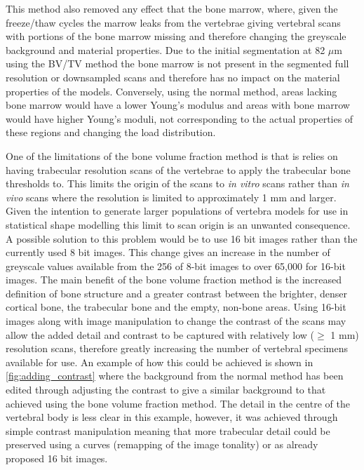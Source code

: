 This method also removed any effect that the bone marrow, where, given the
freeze/thaw cycles the marrow leaks from the vertebrae giving vertebral scans
with portions of the bone marrow missing and therefore changing the greyscale
background and material properties.  Due to the initial segmentation at 82
$\mu$m using the BV/TV method the bone marrow is not present in the segmented
full resolution or downsampled scans and therefore has no impact on the
material properties of the models.  Conversely, using the normal method, areas
lacking bone marrow would have a lower Young's modulus and areas with bone
marrow would have higher Young's moduli, not corresponding to the actual
properties of these regions and changing the load distribution.

One of the limitations of the bone volume fraction method is that is relies on
having trabecular resolution scans of the vertebrae to apply the trabecular
bone thresholds to.  This limits the origin of the scans to \textit{in vitro}
scans rather than \textit{in vivo} scans where the resolution is limited to
approximately 1 mm and larger.  Given the intention to generate larger
populations of vertebra models for use in statistical shape modelling this
limit to scan origin is an unwanted consequence.  A possible solution to this
problem would be to use 16 bit images rather than the currently used 8 bit
images.  This change gives an increase in the number of greyscale values
available from the 256 of 8-bit images to over 65,000 for 16-bit images.  The
main benefit of the bone volume fraction method is the increased definition of
bone structure and a greater contrast between the brighter, denser cortical
bone, the trabecular bone and the empty, non-bone areas.  Using 16-bit images
along with image manipulation to change the contrast of the scans may allow the
added detail and contrast to be captured with relatively low ($\geq$ 1 mm)
resolution scans, therefore greatly increasing the number of vertebral
specimens available for use. An example of how this could be achieved is shown
in \cref{fig:adding_contrast} where the background from the normal method has
been edited through adjusting the contrast to give a similar background to that
achieved using the bone volume fraction method. The detail in the centre of the
vertebral body is less clear in this example, however, it was achieved through
simple contrast manipulation meaning that more trabecular detail could be
preserved using a curves (remapping of the image tonality) or as already
proposed 16 bit images.

